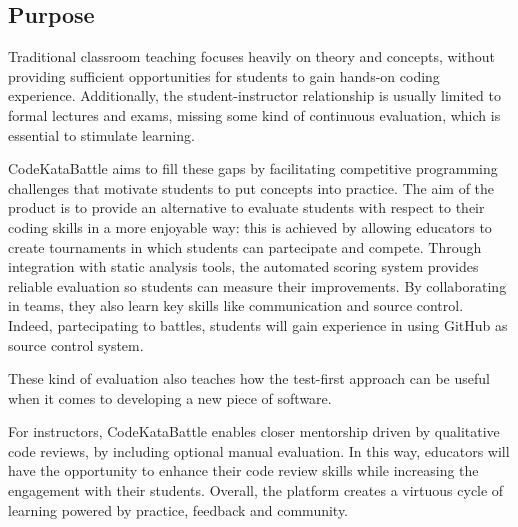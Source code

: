 \subsection{Purpose}
Traditional classroom teaching focuses heavily on theory and concepts, without providing sufficient opportunities for students to gain hands-on coding experience.
Additionally, the student-instructor relationship is usually limited to formal lectures and exams, missing some kind of continuous evaluation, which is essential to stimulate learning.

CodeKataBattle aims to fill these gaps by facilitating competitive programming challenges that motivate students to put concepts into practice. The aim of the product is to provide an alternative to evaluate students with respect to their coding skills in a more enjoyable way: this is achieved by allowing educators to create tournaments in which students can partecipate and compete. Through integration with static analysis tools, the automated scoring system provides reliable evaluation so students can measure their improvements. By collaborating in teams, they also learn key skills like communication and source control. Indeed, partecipating to battles, students will gain experience in using GitHub as source control system.

 These kind of evaluation also teaches how the test-first approach can be useful when it comes to developing a new piece of software.

 For instructors, CodeKataBattle enables closer mentorship driven by qualitative code reviews, by including optional manual evaluation. In this way, educators will have the opportunity to enhance their code review skills while increasing the engagement with their students. Overall, the platform creates a virtuous cycle of learning powered by practice, feedback and community.

